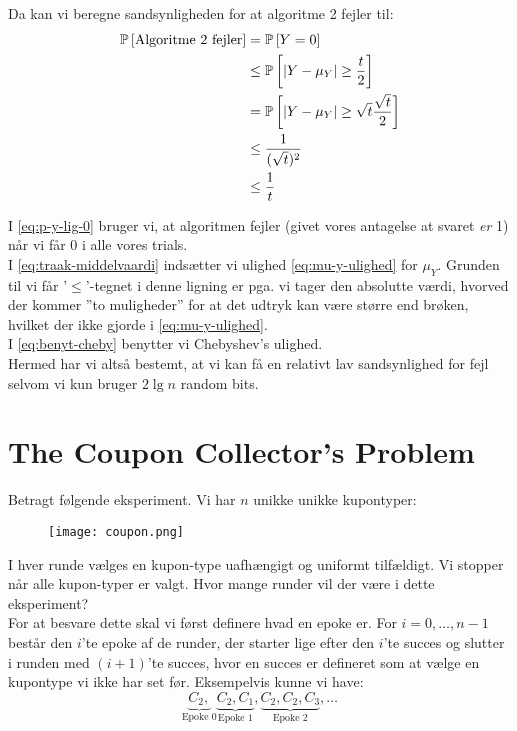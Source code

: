 Da kan vi beregne sandsynligheden for at algoritme 2 fejler til:
\begin{align}
  \P{\text{Algoritme 2 fejler}} &= \P{Y = 0} \label{eq:p-y-lig-0} \\
  &\leq \P{| Y - \mu_Y| \geq \frac{t}{2}} \label{eq:traak-middelvaardi} \\
  &= \P{|Y - \mu_Y| \geq \sqrt{t} \frac{\sqrt{t}}{2}} \nonumber \\
  &\leq \frac{1}{(\sqrt{t})^2} \label{eq:benyt-cheby}\\
  &\leq \frac{1}{t} \nonumber
\end{align}

I \cref{eq:p-y-lig-0} bruger vi, at algoritmen fejler (givet vores antagelse at svaret \emph{er} 1) når vi får 0 i alle vores trials.\\
I \cref{eq:traak-middelvaardi} indsætter vi ulighed \cref{eq:mu-y-ulighed} for $\mu_Y$. Grunden til vi får '$\leq$'-tegnet i denne ligning er pga. vi tager den absolutte værdi, hvorved der kommer ''to muligheder'' for at det udtryk kan være større end brøken, hvilket der ikke gjorde i \cref{eq:mu-y-ulighed}.\\
I \cref{eq:benyt-cheby} benytter vi Chebyshev's ulighed.\\

Hermed har vi altså bestemt, at vi kan få en relativt lav sandsynlighed for fejl selvom vi kun bruger $2 \lg n$ random bits.







\newpage
\section{The Coupon Collector's Problem}
Betragt følgende eksperiment. Vi har $n$ unikke unikke kupontyper:
\begin{figure}[H]
  \begin{center}
  \texttt{[image: coupon.png]}
  \end{center}
  \label{fig:coupon}
\end{figure}

I hver runde vælges en kupon-type uafhængigt og uniformt tilfældigt. Vi stopper når alle kupon-typer er valgt. Hvor mange runder vil der være i dette eksperiment?\\

For at besvare dette skal vi først definere hvad en epoke er. For $i = 0, \dots, n-1$ består den $i$'te epoke af de runder, der starter lige efter den $i$'te succes og slutter i runden med $(i+1)$'te succes, hvor en succes er defineret som at vælge en kupontype vi ikke har set før. Eksempelvis kunne vi have:
$$
  \underbrace{C_2,}_{\text{Epoke 0}} \underbrace{C_2, C_1}_{\text{Epoke 1}}, \underbrace{C_2, C_2, C_3}_{\text{Epoke 2}}, \dots
$$


